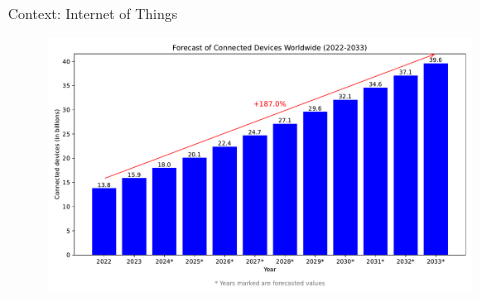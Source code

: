 \begin{frame}{Context: Internet of Things}
\begin{minipage}[c]{0.5\textwidth}
\begin{figure}
            \label{fig:iot_application}
        \end{figure}
        \vspace{-5pt}
        \begin{figure}
            \centering
            \includegraphics[width=.825\textwidth]{src/1_introduction/img/iot_forecasts.pdf}
            \label{fig:nbr_iot}
        \end{figure}
    \end{minipage}
\end{frame}

